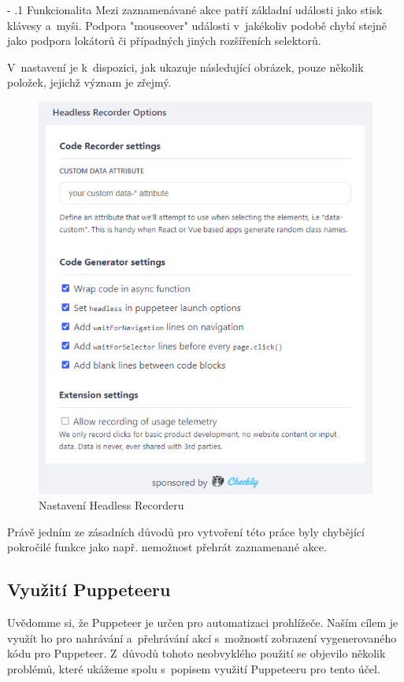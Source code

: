 \documentclass[12pt, a4paper, twoside]{article}
\makeatletter
\renewcommand\paragraph{%
	\@startsection{subparagraph}{5}{0mm}%
	{-\baselineskip}%
	{.1\baselineskip}%
	{\normalfont\normalsize\bfseries}}
\makeatother
\begin{document}
	\paragraph{Funkcionalita}
	Mezi zaznamenávané akce patří základní události jako stisk klávesy a~myši. Podpora "mouseover" události v~jakékoliv podobě chybí stejně jako podpora lokátorů či případných jiných rozšířeních selektorů.
	
	V~nastavení je k~dispozici, jak ukazuje následující obrázek, pouze několik položek, jejichž význam je zřejmý.
    \begin{figure}[H]
		\centering
		\includegraphics[width=1.0\textwidth]{headlessRecorderSettings.png}
		\caption{Nastavení Headless Recorderu}
	\end{figure}
	
	\noindent Právě jedním ze zásadních důvodů pro vytvoření této práce byly chybějící pokročilé funkce jako např. nemožnost přehrát zaznamenané akce.
	\subsection{Využití Puppeteeru}
	\label{sub_sec:PuppeteerUsageForAutomation}
	Uvědomme si, že Puppeteer je určen pro automatizaci prohlížeče. Naším cílem je využít ho pro nahrávání a~přehrávání akcí s~možností zobrazení vygenerovaného kódu pro Puppeteer. Z~důvodů tohoto neobvyklého použití se objevilo několik problémů, které ukážeme spolu s~popisem využití Puppeteeru pro tento účel.
	
\end{document}
